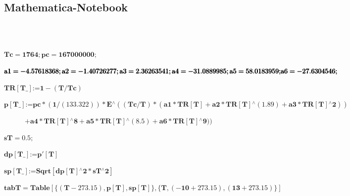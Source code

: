 \subsection{Mathematica-Notebook}

~\\~\\

\newcommand{\mathsym}[1]{{}}
\newcommand{\unicode}[1]{{}}


\begin{doublespace}
\noindent\(\pmb{\text{Tc}=1764; \text{pc}=167000000;}\)
\end{doublespace}

\begin{doublespace}
\noindent\(\pmb{\text{a1}= -4.57618368; \text{a2}=-1.40726277; \text{a3}=2.36263541; \text{a4}=-31.0889985; \text{a5}=58.0183959; }\\
\pmb{\text{a6}=-27.6304546;}\)
\end{doublespace}

\begin{doublespace}
\noindent\(\pmb{\text{TR}[\text{T$\_$}]\text{:=} 1-(T/\text{Tc})}\)
\end{doublespace}

\begin{doublespace}
\noindent\(\pmb{p[\text{T$\_$}]\text{:=} \text{pc}*(1/(133.322))*E{}^{\wedge}((\text{Tc}/T)*(\text{a1}*\text{TR}[T]+\text{a2}*\text{TR}[T]{}^{\wedge}(1.89)+\text{a3}*\text{TR}[T]{}^{\wedge}2))}\)
\end{doublespace}

\begin{doublespace}
~~~~~~\(\pmb{+\text{a4}*\text{TR}[T]{}^{\wedge}8+\text{a5}*\text{TR}[T]{}^{\wedge}(8.5)+\text{a6}*\text{TR}[T]{}^{\wedge}9))}\)
\end{doublespace}

\begin{doublespace}
\noindent\(\pmb{\text{sT}=0.5;}\)
\end{doublespace}

\begin{doublespace}
\noindent\(\pmb{\text{dp}[\text{T$\_$}]\text{:=}p'[T]}\)
\end{doublespace}

\begin{doublespace}
\noindent\(\pmb{\text{sp}[\text{T$\_$}]\text{:=}\text{Sqrt}[\text{dp}[T]{}^{\wedge}2*\text{sT}{}^{\wedge}2]}\)
\end{doublespace}

\begin{doublespace}
\noindent\(\pmb{\text{tabT}=\text{Table}[\{(T-273.15),p[T],\text{sp}[T]\},\{T,(-10+273.15),(13+273.15)\}]}\)
\end{doublespace}

